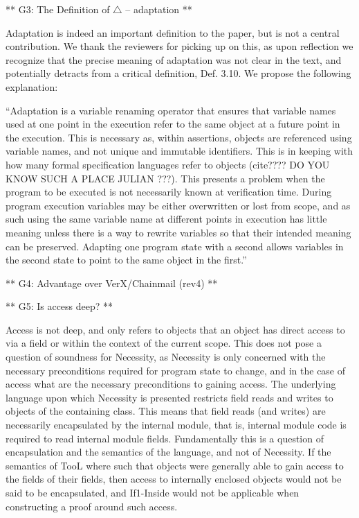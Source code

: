 ** G3: The Definition of $\triangle$ -- adaptation **

Adaptation is indeed an important definition to the paper, but is not a central contribution. We thank the reviewers for picking up on this, as upon reflection we recognize that the precise meaning of adaptation was not clear in the text, and potentially detracts from a critical definition, Def. 3.10. We propose the following explanation:

``Adaptation is a variable renaming operator that ensures that variable names used at one point in the execution refer to the same object at a future point in the execution. This is necessary as, within assertions, objects are referenced using variable names, and not unique and immutable identifiers. This is in keeping with how many formal specification languages refer to objects (cite???? DO YOU KNOW SUCH A PLACE JULIAN ???). This presents a problem when the program to be executed is not necessarily known at verification time. During program execution variables may be either overwritten or lost from scope, and as such using the same variable name at different points in execution has little meaning unless there is a way to rewrite variables so that their intended meaning can be preserved. Adapting one program state with a second allows variables in the second state to point to the same object in the first.''


** G4: Advantage over VerX/Chainmail (rev4) **

** G5: Is access deep? **

Access is not deep, and only refers to objects that an object has direct access to via a field or within the context of the current scope. This does not pose a question of soundness for
Necessity, as Necessity is only concerned with the necessary preconditions required for program state to change, and in the case of access what are the necessary preconditions to 
gaining access. The underlying language upon which Necessity is presented restricts field reads and writes to objects of the containing class. This means that field reads (and writes) 
are necessarily encapsulated by the internal module, that is, internal module code is required to read internal module fields. Fundamentally this is a question of encapsulation and the 
semantics of the language, and not of Necessity. If the semantics of TooL where such that objects were generally able to gain access to the fields of their fields, then access to internally 
enclosed objects would not be said to be encapsulated, and If1-Inside would not be applicable when constructing a proof around such access.

